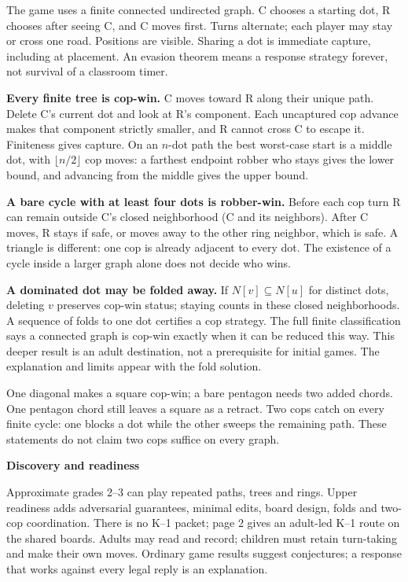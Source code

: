 \documentclass[11pt,letterpaper]{article}
\newcommand{\heading}[1]{\par\vspace{4pt}{\large\bfseries #1}\par}
\newcommand{\sub}[1]{\par\textbf{#1}\par}
\begin{document}
\heading{Mathematical overview}
The game uses a finite connected undirected graph. C chooses a starting dot, R chooses after seeing C, and C moves first. Turns alternate; each player may stay or cross one road. Positions are visible. Sharing a dot is immediate capture, including at placement. An evasion theorem means a response strategy forever, not survival of a classroom timer.

\textbf{Every finite tree is cop-win.} C moves toward R along their unique path. Delete C's current dot and look at R's component. Each uncaptured cop advance makes that component strictly smaller, and R cannot cross C to escape it. Finiteness gives capture. On an $n$-dot path the best worst-case start is a middle dot, with $\lfloor n/2\rfloor$ cop moves: a farthest endpoint robber who stays gives the lower bound, and advancing from the middle gives the upper bound.

\textbf{A bare cycle with at least four dots is robber-win.} Before each cop turn R can remain outside C's closed neighborhood (C and its neighbors). After C moves, R stays if safe, or moves away to the other ring neighbor, which is safe. A triangle is different: one cop is already adjacent to every dot. The existence of a cycle inside a larger graph alone does not decide who wins.

\textbf{A dominated dot may be folded away.} If $N[v]\subseteq N[u]$ for distinct dots, deleting $v$ preserves cop-win status; staying counts in these closed neighborhoods. A sequence of folds to one dot certifies a cop strategy. The full finite classification says a connected graph is cop-win exactly when it can be reduced this way. This deeper result is an adult destination, not a prerequisite for initial games. The explanation and limits appear with the fold solution.

One diagonal makes a square cop-win; a bare pentagon needs two added chords. One pentagon chord still leaves a square as a retract. Two cops catch on every finite cycle: one blocks a dot while the other sweeps the remaining path. These statements do not claim two cops suffice on every graph.

\sub{Discovery and readiness}
Approximate grades 2--3 can play repeated paths, trees and rings. Upper readiness adds adversarial guarantees, minimal edits, board design, folds and two-cop coordination. There is no K--1 packet; page 2 gives an adult-led K--1 route on the shared boards. Adults may read and record; children must retain turn-taking and make their own moves. Ordinary game results suggest conjectures; a response that works against every legal reply is an explanation.
\end{document}
